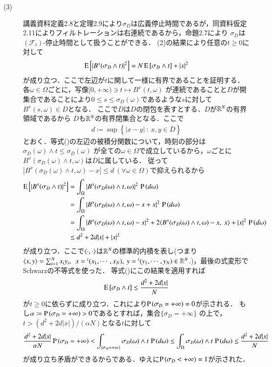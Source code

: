 \begin{prf}
\begin{description}
	\item[(3)] 講義資料定義2.8と定理2.9により$\sigma_D$は広義停止時間であるが，同資料仮定2.11によりフィルトレーションは右連続であるから，命題2.7により
		$\sigma_D$は$(\mathcal{F}_t)$-停止時間として扱うことができる．
		(2)の結果により任意の$t \geq 0$に対して
		\begin{align}
			\operatorname{E} \left[ |B^x(\sigma_D \wedge t)|^2 \right] = N\operatorname{E} \left[ \sigma_D \wedge t \right] + |x|^2 \label{eq:stoc_report_Q2_3}
		\end{align}
		が成り立つ．ここで左辺が$t$に関して一様に有界であることを証明する．各$\omega \in \Omega$ごとに，写像$[0,+\infty) \ni t \longmapsto B^x(t, \omega)$
		が連続であることと$D$が開集合であることにより$0 \leq s \leq \sigma_D(\omega)$であるような$s$に対して$B^x(s, \omega) \in \overline{D}$となる．
		ここで$\overline{D}$は$D$の閉包を表すとする．$D$が$\mathbb{R}^N$の有界領域であるから
		$\overline{D}$も$\mathbb{R}^N$の有界閉集合となる．ここで
		\begin{align}
			d \coloneqq \sup{}{\left\{|x - y|\ :\ x,y \in \overline{D} \right\}}
		\end{align}
		とおく．等式()の左辺の被積分関数について，時刻の部分は$\sigma_D(\omega) \wedge t \leq \sigma_D(\omega)$
		が全ての$\omega \in \Omega$で成立しているから，$\omega$ごとに$B^x(\sigma_D(\omega) \wedge t, \omega)$は$\overline{D}$に属している．
		従って$|B^x(\sigma_D(\omega) \wedge t, \omega) - x| \leq d \ (\forall \omega \in \Omega)$で抑えられるから
		\begin{align}
			\Exp{|B^x(\sigma_D \wedge t)|^2} 
			&= \int_{\Omega} |B^x(\sigma_D(\omega) \wedge t, \omega)|^2\, \prob{d\omega} \\
			&= \int_{\Omega} |B^x(\sigma_D(\omega) \wedge t, \omega) - x + x|^2\, \prob{d\omega} \\
			&= \int_{\Omega} |B^x(\sigma_D(\omega) \wedge t, \omega) - x|^2 + 2\inprod<B^x(\sigma_D(\omega) \wedge t, \omega) - x,\ x> + |x|^2\, \prob{d\omega} \\
			&\leq d^2 + 2d|x| + |x|^2
		\end{align}
		が成り立つ．ここで$\inprod<\cdot, \cdot>$は$\mathbb{R}^N$の標準的内積を表し(つまり$\inprod<x, y> = \sum_{i=1}^{N}x_iy_i,\ \ 
		x={}^t(x_1, \cdots, x_N),\ y={}^t(y_1, \cdots, y_N) \in \R^N$.)，最後の式変形でSchwarzの不等式を使った．
		等式(\refeq{eq:stoc_report_Q2_3})にこの結果を適用すれば
		\begin{align}
			\operatorname{E} \left[ \sigma_D \wedge t \right] \leq \frac{d^2 + 2d|x|}{N}
		\end{align}
		が$t \geq 0$に依らずに成り立つ．これにより$\operatorname{P} \left(\sigma_D = +\infty\right) = 0$が示される．
		もし$\alpha \coloneqq \operatorname{P} \left(\sigma_D = +\infty\right) > 0$であるとすれば，集合$\{ \sigma_D = +\infty \}$
		の上で，$t > (d^2 + 2d|x|)/(\alpha N)$となる$t$に対して
		\begin{align}
			\frac{d^2 + 2d|x|}{\alpha N} \operatorname{P} \left(\sigma_D = +\infty\right) 
			< \int_{\{\sigma_D = +\infty\}} \sigma_D(\omega) \wedge t\, \operatorname{P} \left(d\omega\right)
			\leq \int_{\Omega} \sigma_D(\omega) \wedge t\, \operatorname{P} \left(d\omega\right)
			\leq \frac{d^2 + 2d|x|}{N}
		\end{align}
		が成り立ち矛盾ができるからである．ゆえに$\operatorname{P} \left(\sigma_D < +\infty\right) = 1$が示された．
		\QED
\end{description}
\end{prf}